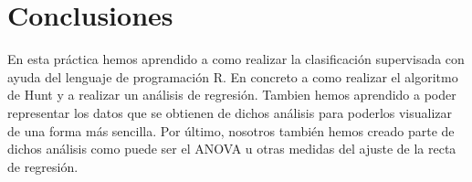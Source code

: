 \documentclass [a4paper] {article}
\begin{document}
\section{Conclusiones}
En esta práctica hemos aprendido a como realizar la clasificación supervisada con ayuda del lenguaje de programación R.
En concreto a como realizar el algoritmo de Hunt y a realizar un análisis de regresión. Tambien hemos aprendido a poder
representar los datos que se obtienen de dichos análisis para poderlos visualizar de una forma más sencilla. Por último,
nosotros también hemos creado parte de dichos análisis como puede ser el ANOVA u otras medidas del ajuste de la recta de
regresión.
\end{document}
